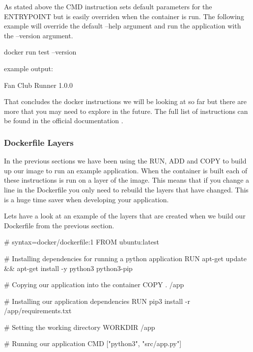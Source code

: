 \documentclass{csse4400}
\begin{document}
As stated above the CMD instruction sets default parameters for the ENTRYPOINT but is easily overriden when the container is run. The following example will override the default --help argument and run the application with the --version argument.

\begin{code}[language=shell,numbers=none]{}
  docker run test --version
\end{code}

example output:

\begin{code}[language=shell,numbers=none]{}
  Fan Club Runner 1.0.0
\end{code}

That concludes the docker instructions we will be looking at so far but there are more that you may need to explore in the future. The full list of instructions can be found in the official documentation \cite{Dockerfile}.

\subsubsection{Dockerfile Layers}

In the previous sections we have been using the RUN, ADD and COPY to build up our image to run an example application. When the container is built each of these instructions is run on a layer of the image. This means that if you change a line in the Dockerfile you only need to rebuild the layers that have changed. This is a huge time saver when developing your application.

Lets have a look at an example of the layers that are created when we build our Dockerfile from the previous section.

\begin{code}[language=docker,numbers=none]{}
  # syntax=docker/dockerfile:1
  FROM ubuntu:latest

  # Installing dependencies for running a python application
  RUN apt-get update && apt-get install -y python3 python3-pip

  # Copying our application into the container
  COPY . /app

  # Installing our application dependencies
  RUN pip3 install -r /app/requirements.txt

  # Setting the working directory
  WORKDIR /app

  # Running our application
  CMD ["python3", "src/app.py"]
\end{code}
\end{document}
